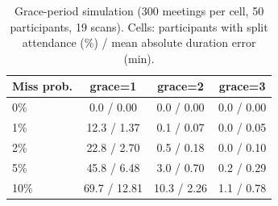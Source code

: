 \begin{table}[t]
\caption{Grace-period simulation (300 meetings per cell, 50 participants, 19 scans). Cells: participants with split attendance (\%) / mean absolute duration error (min).}
\label{tab:grace}
\centering\footnotesize
\begin{tabular}{lccc}
\toprule
Miss prob. & grace=1 & grace=2 & grace=3 \\
\midrule
0\% & 0.0 / 0.00 & 0.0 / 0.00 & 0.0 / 0.00 \\
1\% & 12.3 / 1.37 & 0.1 / 0.07 & 0.0 / 0.05 \\
2\% & 22.8 / 2.70 & 0.5 / 0.18 & 0.0 / 0.10 \\
5\% & 45.8 / 6.48 & 3.0 / 0.70 & 0.2 / 0.29 \\
10\% & 69.7 / 12.81 & 10.3 / 2.26 & 1.1 / 0.78 \\
\bottomrule
\end{tabular}
\end{table}
